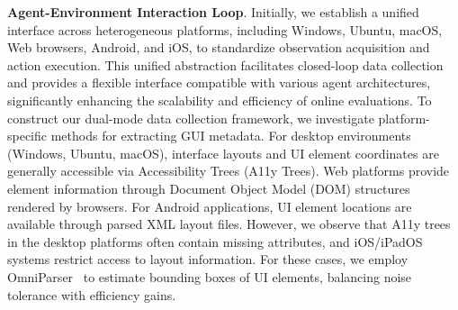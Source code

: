 \documentclass{article} %
\begin{document}
\textbf{Agent-Environment Interaction Loop}. Initially, we establish a unified interface across heterogeneous platforms, including Windows, Ubuntu, macOS, Web browsers, Android, and iOS, to standardize observation acquisition and action execution.
% 
This unified abstraction facilitates closed-loop data collection and provides a flexible interface compatible with various agent architectures, significantly enhancing the scalability and efficiency of online evaluations.
To construct our dual-mode data collection framework, we investigate platform-specific methods for extracting GUI metadata. For desktop environments (Windows, Ubuntu, macOS), interface layouts and UI element coordinates are generally accessible via Accessibility Trees (A11y Trees). Web platforms provide element information through Document Object Model (DOM) structures rendered by browsers. For Android applications, UI element locations are available through parsed XML layout files. 
However, we observe that A11y trees in the desktop platforms often contain missing attributes, and iOS/iPadOS systems restrict access to layout information. For these cases, we employ OmniParser~\citep{yu2025omniparser} to estimate bounding boxes of UI elements, balancing noise tolerance with efficiency gains.
\end{document}
